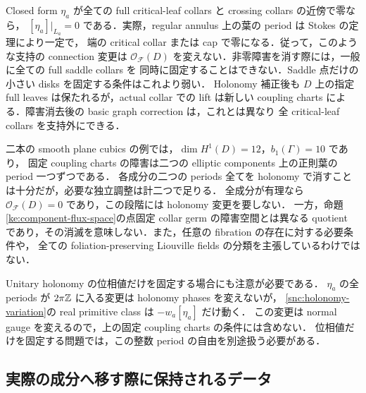 \begin{remark}\label{snc:saddle-support-obstruction}
Closed form $\eta_a$ が全ての full critical-leaf collars と crossing collars の近傍で零なら，
$[\eta_a]|_{L_a}=0$ である．実際，regular annulus 上の葉の period は Stokes の定理により一定で，
端の critical collar または cap で零になる．従って，このような支持の connection 変更は
$\mathcal O_{\mathcal F}(D)$ を変えない．非零障害を消す際には，一般に全ての full saddle collars を
同時に固定することはできない．Saddle 点だけの小さい disks を固定する条件はこれより弱い．
Holonomy 補正後も $D$ 上の指定 full leaves は保たれるが，actual collar での lift は新しい
coupling charts による．障害消去後の basic graph correction は，これとは異なり
全 critical-leaf collars を支持外にできる．
\end{remark}

二本の smooth plane cubics の例では，$\dim H^1(D)=12$，$b_1(\Gamma)=10$ であり，
固定 coupling charts の障害は二つの elliptic components 上の正則葉の period 一つずつである．
各成分の二つの periods 全てを holonomy で消すことは十分だが，必要な独立調整は計二つで足りる．
全成分が有理なら $\mathcal O_{\mathcal F}(D)=0$ であり，この段階には holonomy 変更を要しない．
一方，命題\ref{ke:component-flux-space}の点固定 collar germ の障害空間とは異なる quotient
であり，その消滅を意味しない．また，任意の fibration の存在に対する必要条件や，
全ての foliation-preserving Liouville fields の分類を主張しているわけではない．

Unitary holonomy の位相値だけを固定する場合にも注意が必要である．
$\eta_a$ の全 periods が $2\pi\mathbb Z$ に入る変更は holonomy phases を変えないが，
\eqref{snc:holonomy-variation}の real primitive class は $-w_a[\eta_a]$ だけ動く．
この変更は normal gauge を変えるので，上の固定 coupling charts の条件には含めない．
位相値だけを固定する問題では，この整数 period の自由を別途扱う必要がある．

\subsection{実際の成分へ移す際に保持されるデータ}
\label{snc:output-data}

